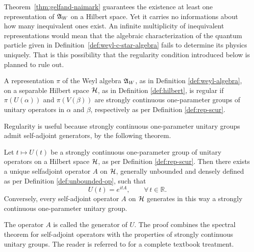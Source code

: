 	Theorem~\ref{thm:gelfand-naimark} guarantees the existence at least one representation of $\mathfrak{A}_W$ on a Hilbert space. Yet it carries no informations about how many inequivalent ones exist. An infinite multiplicity of inequivalent representations would mean that the algebraic characterization of the quantum particle given in Definition~\ref{def:weyl-c-star-algebra} fails to determine its physics uniquely. That is this possibility that the regularity condition introduced below is planned to rule out.
	
	\begin{definition}
		\label{def:regular-representation}
		A representation $\pi$ of the Weyl algebra $\mathfrak{A}_W$, as in Definition \ref{def:weyl-algebra}, on a separable Hilbert space $\H$, as in Definition \ref{def:hilbert}, is regular if $\pi(U(\alpha))$ and $\pi(V(\beta))$ are strongly continuous one-parameter groups of unitary operators in $\alpha$ and $\beta$, respectively as per Definition \ref{def:rep-scur}.
	\end{definition}
	
	\noindent Regularity is useful because strongly continuous one-parameter unitary groups admit self-adjoint generators, by the following theorem.
	
	\begin{theorem}
		\label{thm:stone}
		Let $t \mapsto U(t)$ be a strongly continuous one-parameter group of unitary operators on a Hilbert space $\H$, as per Definition \ref{def:rep-scur}. Then there exists a unique selfadjoint operator $A$ on $\H$, generally unbounded and densely defined as per Definition \ref{def:unbounded-op}, such that
		\begin{equation}
			U(t) = e^{itA}, \qquad \forall\, t \in \mathbb{R}.
		\end{equation}
		Conversely, every self-adjoint operator $A$ on $\H$ generates in this way a strongly continuous one-parameter unitary group.
	\end{theorem}
	
	\noindent The operator $A$ is called the generator of $U$. The proof combines the spectral theorem for self-adjoint operators with the properties of strongly continuous unitary groups. The reader is referred to 
	\cite[Theorem 9.33]{morettiSpectralTheoryQuantum} for a complete textbook treatment.
	
